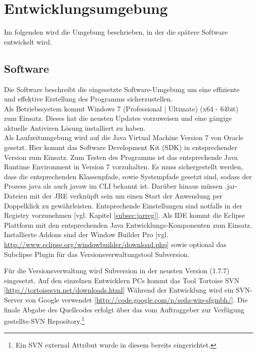 \section{Entwicklungsumgebung}
\label{sec:Entwicklungsumgebung}

Im folgenden wird die Umgebung beschrieben, in der die spätere Software entwickelt wird.

\subsection{Software}
\label{subsec:devsoftware}

Die Software beschreibt die eingesetzte Software-Umgebung um eine effiziente und effektive Erstellung des Programms sicherzustellen.\\

Als Betriebssystem kommt Windows 7 (Professional | Ultimate) (x64 - 64bit) zum Einsatz. Dieses hat die neusten Updates vorzuweisen und eine gängige aktuelle Antiviren Lösung installiert zu haben.\\

Als Laufzeitumgebung wird auf die Java Virtual Machine Version 7 von Oracle gesetzt. Hier kommt das Software Development Kit (SDK) in entsprechender Version zum Einsatz.
Zum Testen des Programms ist das entsprechende Java Runtime Environment in Version 7 vorzuhalten. Es muss sichergestellt werden, dass die entsprechenden Klassenpfade, sowie Systempfade gesetzt sind, sodass der Prozess java als auch javaw im CLI bekannt ist. Darüber hinaus müssen .jar-Dateien mit der JRE verknüpft sein um einen Start der Anwendung per Doppelklick zu gewährleisten. Entsprechende Einstellungen sind notfalls in der Registry vorzunehmen [vgl. Kapitel \ref{subsec:jarreg}].
Als IDE kommt die Eclipse Plattform mit den entsprechenden Java Entwicklungs-Komponenten zum Einsatz. Installierte Addons sind der Window Builder Pro [vgl. \url{http://www.eclipse.org/windowbuilder/download.php}] sowie optional das Subclipse Plugin für das Versionsverwaltungstool Subversion.

Für die Versionsverwaltung wird Subversion in der neusten Version (1.7.7) eingesetzt. Auf den einzelnen Entwicklern PCs kommt das Tool Tortoise SVN [\url{http://tortoisesvn.net/downloads.html}]
Während der Entwicklung wird ein SVN-Server von Google verwendet [\url{http://code.google.com/p/seda-wip-sfgmbh/}]. Die finale Abgabe des Quellcodes erfolgt über das vom Auftraggeber zur Verfügung gestellte-SVN Repository.\footnote{Ein SVN external Attribut wurde in diesem bereits eingerichtet.}\\

